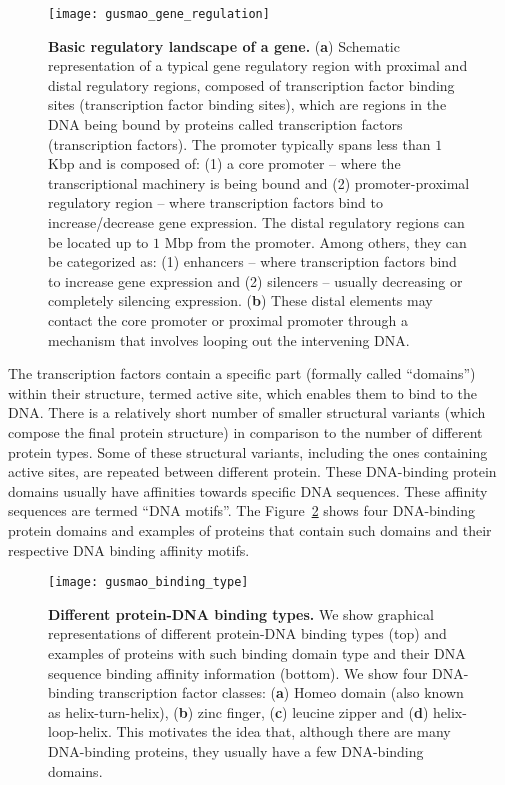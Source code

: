 \begin{figure}[h!]
\centering
\texttt{[image: gusmao\_gene\_regulation]}
\caption[Basic regulatory landscape of a gene]{\textbf{Basic regulatory landscape of a gene.} (\textbf{a}) Schematic representation of a typical gene regulatory region with proximal and distal regulatory regions, composed of transcription factor binding sites (transcription factor binding sites), which are regions in the DNA being bound by proteins called transcription factors (transcription factors). The promoter typically spans less than $1$ Kbp and is composed of: (1) a core promoter -- where the transcriptional machinery is being bound and (2) promoter-proximal regulatory region -- where transcription factors bind to increase/decrease gene expression. The distal regulatory regions can be located up to $1$ Mbp from the promoter. Among others, they can be categorized as: (1) enhancers -- where transcription factors bind to increase gene expression and (2) silencers -- usually decreasing or completely silencing expression. (\textbf{b}) These distal elements may contact the core promoter or proximal promoter through a mechanism that involves looping out the intervening DNA.}
\label{fig:gusmao_gene_regulation}
\end{figure}

The transcription factors contain a specific part (formally called ``domains'') within their structure, termed active site, which enables them to bind to the DNA. There is a relatively short number of smaller structural variants (which compose the final protein structure) in comparison to the number of different protein types. Some of these structural variants, including the ones containing active sites, are repeated between different protein. These DNA-binding protein domains usually have affinities towards specific DNA sequences. These affinity sequences are termed ``DNA motifs''. The Figure~\ref{fig:gusmao_binding_type} shows four DNA-binding protein domains and examples of proteins that contain such domains and their respective DNA binding affinity motifs.

\begin{figure}[h!]
\centering
\texttt{[image: gusmao\_binding\_type]}
\caption[Different protein-DNA binding types]{\textbf{Different protein-DNA binding types.} We show graphical representations of different protein-DNA binding types (top) and examples of proteins with such binding domain type and their DNA sequence binding affinity information (bottom). We show four DNA-binding transcription factor classes: (\textbf{a}) Homeo domain (also known as helix-turn-helix), (\textbf{b}) zinc finger, (\textbf{c}) leucine zipper and (\textbf{d}) helix-loop-helix. This motivates the idea that, although there are many DNA-binding proteins, they usually have a few DNA-binding domains.}
\label{fig:gusmao_binding_type}
\end{figure}

